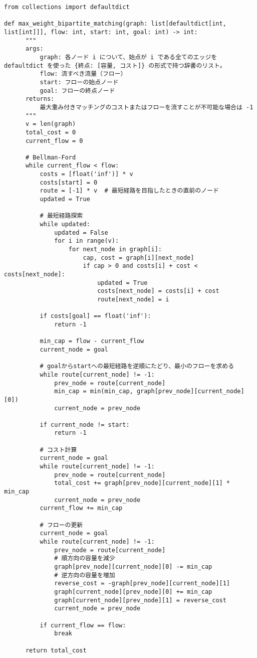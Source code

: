 \begin{lstlisting}[caption=重み付き二部グラフの最大マッチング問題の実装, label=weighted_bipartite_matching, frame=TRBL, label={weighted_bipartite_matching}]
from collections import defaultdict

def max_weight_bipartite_matching(graph: list[defaultdict[int, list[int]]], flow: int, start: int, goal: int) -> int:
      """
      args:
          graph: 各ノード i について、始点が i である全てのエッジを defaultdict を使った {終点: [容量, コスト]} の形式で持つ辞書のリスト。
          flow: 流すべき流量（フロー）
          start: フローの始点ノード
          goal: フローの終点ノード
      returns:
          最大重み付きマッチングのコストまたはフローを流すことが不可能な場合は -1
      """
      v = len(graph)
      total_cost = 0
      current_flow = 0
  
      # Bellman-Ford 
      while current_flow < flow:
          costs = [float('inf')] * v
          costs[start] = 0
          route = [-1] * v  # 最短経路を目指したときの直前のノード
          updated = True
  
          # 最短経路探索
          while updated:
              updated = False
              for i in range(v):
                  for next_node in graph[i]:
                      cap, cost = graph[i][next_node]
                      if cap > 0 and costs[i] + cost < costs[next_node]:
                          updated = True
                          costs[next_node] = costs[i] + cost
                          route[next_node] = i
  
          if costs[goal] == float('inf'):
              return -1
  
          min_cap = flow - current_flow
          current_node = goal
  
          # goalからstartへの最短経路を逆順にたどり、最小のフローを求める
          while route[current_node] != -1:
              prev_node = route[current_node]
              min_cap = min(min_cap, graph[prev_node][current_node][0])
              current_node = prev_node
  
          if current_node != start:
              return -1
  
          # コスト計算
          current_node = goal
          while route[current_node] != -1:
              prev_node = route[current_node]
              total_cost += graph[prev_node][current_node][1] * min_cap
              current_node = prev_node
          current_flow += min_cap
  
          # フローの更新
          current_node = goal
          while route[current_node] != -1:
              prev_node = route[current_node]
              # 順方向の容量を減少
              graph[prev_node][current_node][0] -= min_cap
              # 逆方向の容量を増加
              reverse_cost = -graph[prev_node][current_node][1]
              graph[current_node][prev_node][0] += min_cap
              graph[current_node][prev_node][1] = reverse_cost
              current_node = prev_node
  
          if current_flow == flow:
              break
  
      return total_cost
\end{lstlisting}

